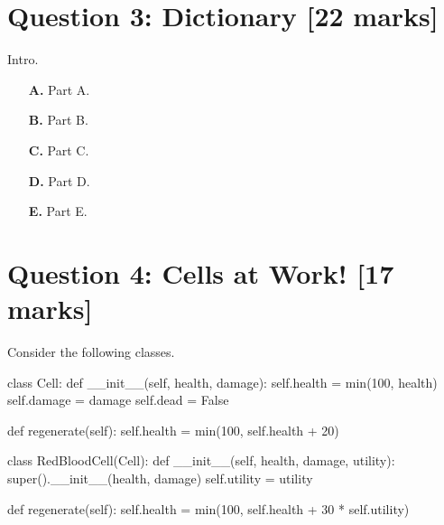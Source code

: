 \section{Question 3: Dictionary [22 marks]}
Intro.
\begin{enumerate}
\item[\textbf{A.}]
Part A.
\begin{flushright}
    [3 marks]
\end{flushright}

\item[\textbf{B.}]
Part B.
\begin{flushright}
    [3 marks]
\end{flushright}

\item[\textbf{C.}]
Part C.
\begin{flushright}
    [4 marks]
\end{flushright}

\item[\textbf{D.}]
Part D.
\begin{flushright}
    [6 marks]
\end{flushright}

\item[\textbf{E.}]
Part E.
\begin{flushright}
    [6 marks]
\end{flushright}
\end{enumerate}

\newpage
\section{Question 4: Cells at Work! [17 marks]}
Consider the following classes.
\begin{python}
class Cell:
    def __init__(self, health, damage):
        self.health = min(100, health)
        self.damage = damage
        self.dead = False

    def regenerate(self):
        self.health = min(100, self.health + 20)

class RedBloodCell(Cell):
    def __init__(self, health, damage, utility):
        super().__init__(health, damage)
        self.utility = utility

    def regenerate(self):
        self.health = min(100, self.health + 30 * self.utility)
\end{python}

